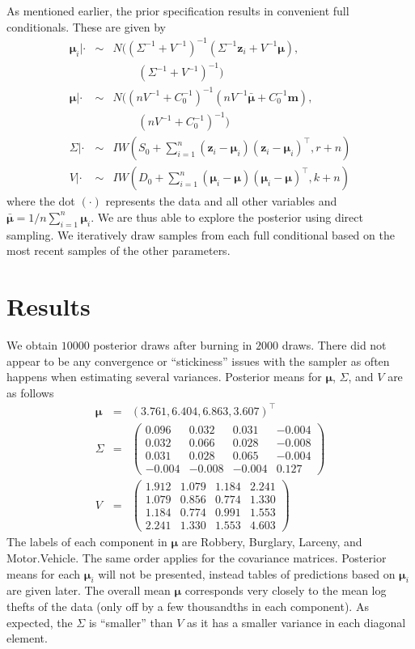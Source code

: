 \documentclass{asaproc}
\newcommand{\m}[1]{\mathbf{\bm{#1}}}
\begin{document}
As mentioned earlier, the prior specification results in convenient full conditionals. These are given by
\begin{eqnarray}
\m{\mu}_i|\cdot &\sim& N((\Sigma^{-1}+V^{-1})^{-1}(\Sigma^{-1}\m{z}_i+V^{-1}\m{\mu}), \nonumber \\
&& ~~~~~ ~~~~~ (\Sigma^{-1}+V^{-1})^{-1}) \\
\m{\mu}|\cdot &\sim& N((nV^{-1}+C_0^{-1})^{-1}(nV^{-1}\bar{\m{\mu}}+C_0^{-1}\m{m}), \nonumber \\
&& ~~~~~ ~~~~~ (nV^{-1}+C_0^{-1})^{-1}) \\
\Sigma|\cdot &\sim& IW(S_0+\sum_{i=1}^n(\m{z}_i-\m{\mu}_i)(\m{z}_i-\m{\mu}_i)^\top, r+n) \\
V|\cdot &\sim& IW(D_0+\sum_{i=1}^n(\m{\mu}_i-\m{\mu})(\m{\mu}_i-\m{\mu})^\top, k+n)
\end{eqnarray}
where the dot $(\cdot)$ represents the data and all other variables and $\bar{\m{\mu}}=1/n\sum_{i=1}^n\m{\mu}_i$. We are thus able to explore the posterior using direct sampling. We iteratively draw samples from each full conditional based on the most recent samples of the other parameters.

\section{Results}

We obtain $10000$ posterior draws after burning in $2000$ draws. There did not appear to be any convergence or ``stickiness'' issues with the sampler as often happens when estimating several variances. Posterior means for $\m{\mu}$, $\Sigma$, and $V$ are as follows
\begin{eqnarray*}
\m{\mu}&=&(3.761, 6.404, 6.863, 3.607)^\top \\
\Sigma&=&\left(\begin{array}{rrrr}
 0.096 &  0.032 &  0.031 & -0.004 \\
 0.032 &  0.066 &  0.028 & -0.008 \\
 0.031 &  0.028 &  0.065 & -0.004 \\
-0.004 & -0.008 & -0.004 &  0.127
\end{array}\right)  \\
V&=&\left(\begin{array}{rrrr}
1.912 & 1.079 & 1.184 & 2.241 \\
1.079 & 0.856 & 0.774 & 1.330 \\
1.184 & 0.774 & 0.991 & 1.553 \\
2.241 & 1.330 & 1.553 & 4.603
\end{array}\right)
\end{eqnarray*}
The labels of each component in $\m{\mu}$ are Robbery, Burglary, Larceny, and Motor.Vehicle. The same order applies for the covariance matrices. Posterior means for each $\m{\mu}_i$ will not be presented, instead tables of predictions based on $\m{\mu}_i$ are given later. The overall mean $\m{\mu}$ corresponds very closely to the mean log thefts of the data (only off by a few thousandths in each component). As expected, the $\Sigma$ is ``smaller'' than $V$ as it has a smaller variance in each diagonal element.
\end{document}
